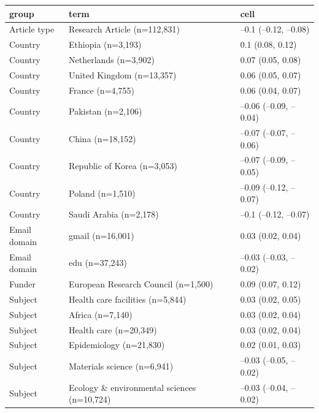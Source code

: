 \begin{table}[ht]
\centering
\begin{tabular}{lll}
 group & term & cell \\ 
  \hline
Article type & Research Article
(n=112,831) & --0.1 (--0.12, --0.08) \\ 
  Country & Ethiopia
(n=3,193) & 0.1 (0.08, 0.12) \\ 
  Country & Netherlands
(n=3,902) & 0.07 (0.05, 0.08) \\ 
  Country & United Kingdom
(n=13,357) & 0.06 (0.05, 0.07) \\ 
  Country & France
(n=4,755) & 0.06 (0.04, 0.07) \\ 
  Country & Pakistan
(n=2,106) & --0.06 (--0.09, --0.04) \\ 
  Country & China
(n=18,152) & --0.07 (--0.07, --0.06) \\ 
  Country & Republic of Korea
(n=3,053) & --0.07 (--0.09, --0.05) \\ 
  Country & Poland
(n=1,510) & --0.09 (--0.12, --0.07) \\ 
  Country & Saudi Arabia
(n=2,178) & --0.1 (--0.12, --0.07) \\ 
  Email domain & gmail
(n=16,001) & 0.03 (0.02, 0.04) \\ 
  Email domain & edu
(n=37,243) & --0.03 (--0.03, --0.02) \\ 
  Funder & European Research Council
(n=1,500) & 0.09 (0.07, 0.12) \\ 
  Subject & Health care facilities
(n=5,844) & 0.03 (0.02, 0.05) \\ 
  Subject & Africa
(n=7,140) & 0.03 (0.02, 0.04) \\ 
  Subject & Health care
(n=20,349) & 0.03 (0.02, 0.04) \\ 
  Subject & Epidemiology
(n=21,830) & 0.02 (0.01, 0.03) \\ 
  Subject & Materials science
(n=6,941) & --0.03 (--0.05, --0.02) \\ 
  Subject & Ecology \& environmental sciences
(n=10,724) & --0.03 (--0.04, --0.02) \\ 
  \end{tabular}
\end{table}
